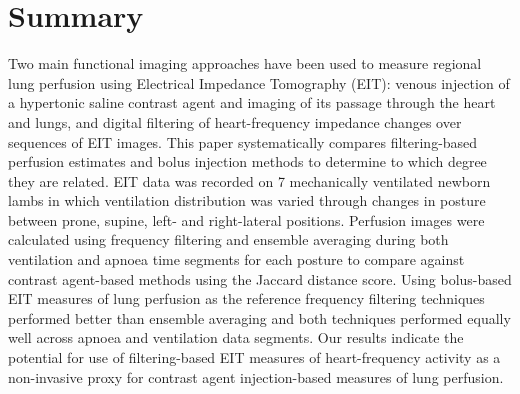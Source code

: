 \section{Summary}
    Two main functional imaging approaches have been used to measure regional lung perfusion 
    using Electrical Impedance Tomography (EIT): venous injection of a hypertonic saline contrast
    agent and imaging of its passage through the heart and lungs, and digital filtering 
    of heart-frequency impedance changes over sequences of EIT images.
    This paper systematically compares filtering-based perfusion estimates and 
    bolus injection methods to determine to which degree they are related.
    EIT data was recorded on 7 mechanically ventilated newborn lambs in which 
    ventilation distribution was varied through changes in posture
    between prone, supine, left- and right-lateral positions.
    Perfusion images were calculated using frequency filtering and ensemble averaging 
    during both ventilation and apnoea time segments for each posture to compare against 
    contrast agent-based methods using the Jaccard distance score. 
    Using bolus-based EIT measures of lung perfusion as the reference
    frequency filtering techniques performed better than ensemble averaging
    and both techniques performed equally well across apnoea and ventilation data segments.
    Our results indicate the potential for use of
    filtering-based EIT measures of heart-frequency activity as a non-invasive
    proxy for contrast agent injection-based measures of lung perfusion. 
